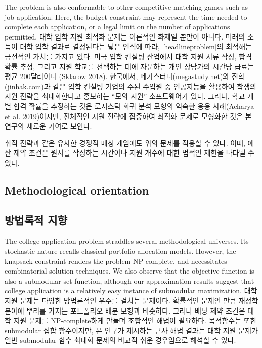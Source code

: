 \documentclass[11pt]{article} %
\theoremstyle{definition}
\theoremstyle{definition}
\begin{document}
The problem is also conformable to other competitive matching games such as job application. Here, the budget constraint may represent the time needed to complete each application, or a legal limit on the number of applications permitted.
\else
대학 입학 지원 최적화 문제는 이론적인 화제일 뿐만이 아니다. 미래의 소득이 대학 입학 결과로 결정된다는 넓은 인식에 따라, \eqref{headlineproblem}의 최적해는 금전적인 가치를 가지고 있다. 미국 입학 컨설팅 산업에서 대학 지원 서류 작성, 합격 확률 추정, 그리고 지원 학교를 선택하는 데에 자문하는 개인 상담가의 시간당 급료는 평균 200달러이다 (Sklarow 2018). 한국에서, 메가스터디(\url{megastudy.net})와 진학(\url{jinhak.com})과 같은 입학 컨설팅 기업의 주된 수입원 중 인공지능을 활용하여 학생의 지원 전략을 최대화한다고 홍보하는 ``모의 지원'' 소프트웨어가 있다. 그러나, 학교 개별 합격 확률을 추정하는 것은 로지스틱 회귀 분석 모형의 익숙한 응용 사례(Acharya et al. 2019)이지만, 전체적인 지원 전략에 집중하여 최적화 문제로 모형화한 것은 본 연구의 새로운 기여로 보인다.

취직 전략과 같은 유사한 경쟁적 매칭 게임에도 위의 문제를 적용할 수 있다. 이때, 예산 제약 조건은 원서를 작성하는 시간이나 지원 개수에 대한 법적인 제한을 나타낼 수 있다.
\fi


\ifen \subsection{Methodological orientation} \else \subsection{방법록적 지향} \fi
\ifen
The college application problem straddles several methodological universes. Its stochastic nature recalls classical portfolio allocation models. However, the knapsack constraint renders the problem NP-complete, and necessitates combinatorial solution techniques. We also observe that the objective function is also a submodular set function, although our approximation results suggest that college application is a relatively easy instance of submodular maximization.
\else
대학 지원 문제는 다양한 방법론적인 우주를 걸치는 문제이다.  확률적인 문제인 만큼 재정학 분야에 뿌리를 가지는 포트폴리오 배분 모형과 비슷하다. 그러나 배낭 제약 조건은 대학 지원 문제를 NP-complete하게 만들며 조합적인 해법이 필요하다. 목적함수는 또한 submodular 집합 함수이지만, 본 연구가 제시하는 근사 해법 결과는 대학 지원 문제가 일반 submodular 함수 최대화 문제의 비교적 쉬운 경우임으로 해석할 수 있다.
\fi
\end{document}
